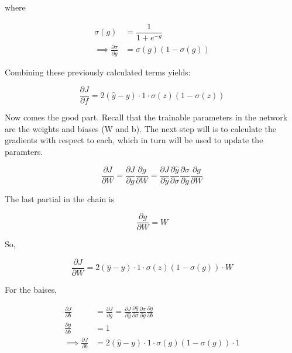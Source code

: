 \noindent where

\begin{align}
\sigma(g) &= \dfrac{1}{1 + e^{-g}} \\
\implies \frac{\partial \sigma}{\partial g} &= \sigma(g)(1 - \sigma(g))
\end{align}

\noindent Combining these previously calculated terms yields:

\begin{equation}
\frac{\partial J}{\partial f} = 2(\hat{y} - y ) \cdot 1 \cdot  \sigma(z)(1 - \sigma(z))
\end{equation}

Now comes the good part. Recall that the trainable parameters in the network are the weights and biases (W and b). The next step will is to calculate the gradients with respect to each, which in turn will be used to update the paramters.

\begin{equation}
\frac{\partial J}{\partial W} = \frac{\partial J}{\partial g}\frac{\partial g}{\partial W} = \frac{\partial J}{\partial \hat{y}} \frac{\partial \hat{y}}{\partial \sigma} \frac{\partial \sigma}{\partial g} \frac{\partial g}{\partial W}
\end{equation}

\noindent The last partial in the chain is

\begin{equation}
\frac{\partial g}{\partial W} = W
\end{equation}


\noindent So,

\begin{equation}
\frac{\partial J}{\partial W} = 2(\hat{y} - y ) \cdot 1 \cdot  \sigma(z)(1 - \sigma(g)) \cdot W
\end{equation}

\noindent For the baises,

\begin{align}
\label{eqn:dLdW}
\frac{\partial J}{\partial b} &= \frac{\partial J}{\partial g} = \frac{\partial J}{\partial \hat{y}} \frac{\partial \hat{y}}{\partial \sigma} \frac{\partial \sigma}{\partial g} \frac{\partial g}{\partial b} \\
\frac{\partial g}{\partial b} &= 1 \\
\implies \frac{\partial J}{\partial b} &= 2(\hat{y} - y ) \cdot 1 \cdot  \sigma(g)(1 - \sigma(g)) \cdot 1
\end{align}

